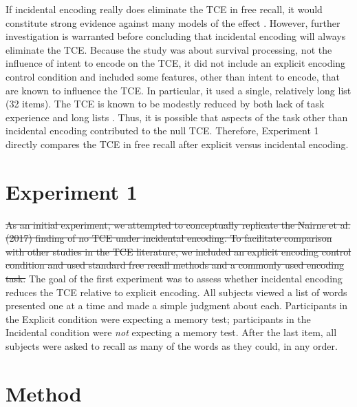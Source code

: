 \documentclass[man,natbib,floatsintext]{apa6} %
\begin{document}
If incidental encoding really does eliminate the TCE in free recall, it would constitute strong evidence against many models of the effect \citep[e.g.,][]{LohnEtal14,HealKaha16}. However, further investigation is warranted before concluding that incidental encoding will always eliminate the TCE. Because the \citep{NairEtal17} study was about survival processing, not the influence of intent to encode on the TCE, it did not include an explicit encoding control condition and included some features, other than intent to encode, that are known to influence the TCE. In particular, it used a single, relatively long list (32 items). The TCE is known to be modestly reduced by both lack of task experience and long lists \citep{HealKaha17}. Thus, it is possible that aspects of the task other than incidental encoding contributed to the null TCE. Therefore, Experiment 1 directly compares the TCE in \label{TODO-3} free recall after explicit versus incidental encoding.
\color{black}

\section{Experiment 1}
\st{As an initial experiment, we attempted to conceptually replicate the Nairne et al. (2017) finding of no TCE under incidental encoding. To facilitate comparison with other studies in the TCE literature, we included an explicit encoding control condition and used standard free recall methods and a commonly used encoding task.}
\color{red}
The goal of the first experiment was to assess whether incidental encoding reduces the TCE relative to explicit encoding. All subjects viewed a list of words presented one at a time and made a simple judgment about each. Participants in the Explicit condition were expecting a memory test; participants in the Incidental condition were \emph{not} expecting a memory test.  After the last item, all subjects were asked to recall as many of the words as they could, in any order. 
\color{black}

\section{Method}

\newcommand\listlength{16} %
\newcommand\presrate{4 seconds} %
\newcommand\isi{1 second} %
\newcommand\DFRDelay{16 second} %
\newcommand\recalltime{75 seconds} %
\newcommand\totalss{XX}
\newcommand\totalexcluded{XX}
\end{document}
